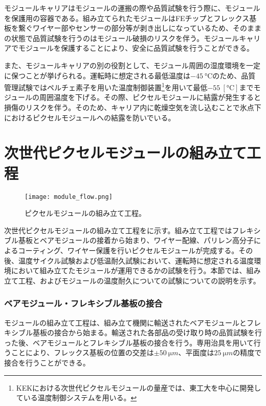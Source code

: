 モジュールキャリアはモジュールの運搬の際や品質試験を行う際に、モジュールを保護用の容器である。組み立てられたモジュールはFEチップとフレックス基板を繋ぐワイヤー部やセンサーの部分等が剥き出しになっているため、そのままの状態で品質試験を行うのはモジュール破損のリスクを伴う。モジュールキャリアでモジュールを保護することにより、安全に品質試験を行うことができる。

また、モジュールキャリアの別の役割として、モジュール周囲の湿度環境を一定に保つことが挙げられる。運転時に想定される最低温度は$-45\ \si{\degreeCelsius}$のため、品質管理試験ではペルチェ素子を用いた温度制御装置\footnote{KEKにおける次世代ピクセルモジュールの量産では、東工大を中心に開発している温度制御システムを用いる。}を用いて最低$-55\ [\si{\degreeCelsius}]$までモジュールの周囲温度を下げる。その際、ピクセルモジュールに結露が発生すると損傷のリスクを伴う。そのため、キャリア内に乾燥空気を流し込むことで氷点下におけるピクセルモジュールへの結露を防いでいる。

\section{次世代ピクセルモジュールの組み立て工程}
\label{sec:assemble}
\begin{figure}[tbp]
  \centering
  \texttt{[image: module\_flow.png]}
  \caption[ピクセルモジュールの組み立て工程]{ピクセルモジュールの組み立て工程。 }
  \label{fig:assemble}
\end{figure}


次世代ピクセルモジュールの組み立て工程をに示す。組み立て工程ではフレキシブル基板とベアモジュールの接着から始まり、ワイヤー配線、パリレン高分子によるコーティング、ワイヤー保護を行いピクセルモジュールが完成する。その後、温度サイクル試験および低温耐久試験において、運転時に想定される温度環境において組み立てたモジュールが運用できるかの試験を行う。本節では、組み立て工程、およびモジュールの温度耐久についての試験についての説明を示す。

\subsubsection*{ベアモジュール・フレキシブル基板の接合}

モジュールの組み立て工程は、組み立て機関に輸送されたベアモジュールとフレキシブル基板の接合から始まる。輸送された各部品の受け取り時の品質試験を行った後、ベアモジュールとフレキシブル基板の接合を行う。専用治具を用いて行うことにより、フレックス基板の位置の交差は$\pm 50\ \si{\micro m}$、平面度は$25\ \si{\micro m}$の精度で接合を行うことができる。


